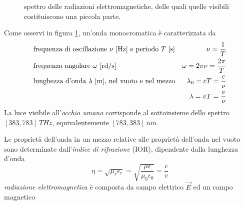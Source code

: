 \begin{figure}[t]
	\caption{spettro delle radiazioni elettromagnetiche, delle quali quelle visibili costituiscono una piccola parte.}
	\label{chapter1:spectrum}
\end{figure}
%
Come osservi in figura \ref{chapter1:spectrum}, un'onda monocromatica \`e caratterizzata da
\begin{alignat}{2}
	&\text{frequenza di oscillazione $\nu$ [\si{Hz}] e periodo $T$ [\si{s}]} & \nu = \frac{1}{T} \\
	&\text{frequenza angolare $\omega$ [\si{rd/s}]} & \omega = 2\pi\nu = \frac{2\pi}{T} \\
	&\text{lunghezza d'onda $\lambda$ [\si{m}], nel vuoto e nel mezzo} & \lambda_0 = cT = \frac{c}{\nu} \\
	& & \lambda = vT = \frac{v}{\nu}
\end{alignat}
La luce visibile all'\textit{occhio umano} corrisponde al sottoinsieme dello spettro $[383, 783]\ \si{THz}$, equivalentemente $[783, 383]\ \si{nm}$\par
Le propriet\`a dell'onda in un mezzo relative alle propriet\`a dell'onda nel vuoto sono determinate dall'\textit{indice di rifrazione} (IOR), dipendente
dalla lunghezza d'onda
\begin{equation}
	\eta = \sqrt{\mu_r \epsilon_r} = \sqrt{\frac{\mu \epsilon}{\mu_0 \epsilon_0}} = \frac{c}{v} 
\end{equation}
\textit{radiazione elettromagnetica} \`e composta da campo elettrico $\overrightarrow{E}$ ed un campo magnetico 
